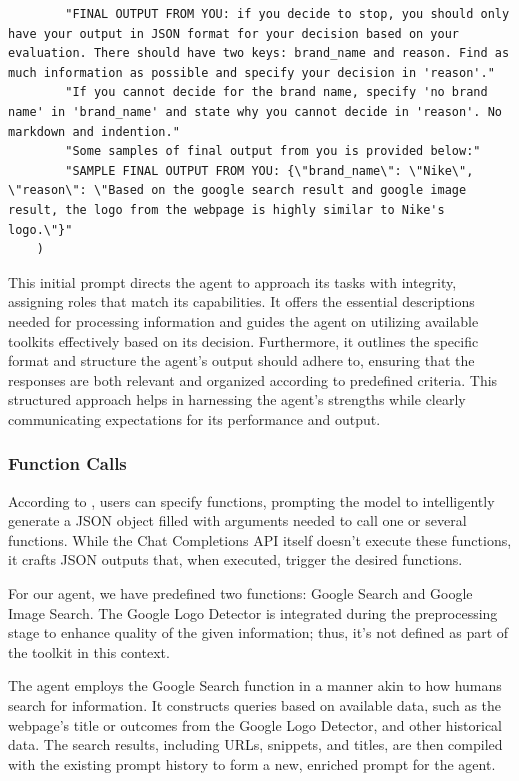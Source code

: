 \begin{lstlisting}
        "FINAL OUTPUT FROM YOU: if you decide to stop, you should only have your output in JSON format for your decision based on your evaluation. There should have two keys: brand_name and reason. Find as much information as possible and specify your decision in 'reason'."
        "If you cannot decide for the brand name, specify 'no brand name' in 'brand_name' and state why you cannot decide in 'reason'. No markdown and indention."
        "Some samples of final output from you is provided below:"
        "SAMPLE FINAL OUTPUT FROM YOU: {\"brand_name\": \"Nike\", \"reason\": \"Based on the google search result and google image result, the logo from the webpage is highly similar to Nike's logo.\"}"
    )
\end{lstlisting}

This initial prompt directs the agent to approach its tasks with integrity, assigning roles that match its capabilities. It offers the essential descriptions needed for processing information and guides the agent on utilizing available toolkits effectively based on its decision. Furthermore, it outlines the specific format and structure the agent's output should adhere to, ensuring that the responses are both relevant and organized according to predefined criteria. This structured approach helps in harnessing the agent's strengths while clearly communicating expectations for its performance and output.

\subsubsection{Function Calls}

According to \cite{openai2023gpt}, users can specify functions, prompting the model to intelligently generate a JSON object filled with arguments needed to call one or several functions. While the Chat Completions API itself doesn't execute these functions, it crafts JSON outputs that, when executed, trigger the desired functions.

For our agent, we have predefined two functions: Google Search and Google Image Search. The Google Logo Detector is integrated during the preprocessing stage to enhance quality of the given information; thus, it's not defined as part of the toolkit in this context.

The agent employs the Google Search function in a manner akin to how humans search for information. It constructs queries based on available data, such as the webpage's title or outcomes from the Google Logo Detector, and other historical data. The search results, including URLs, snippets, and titles, are then compiled with the existing prompt history to form a new, enriched prompt for the agent.

